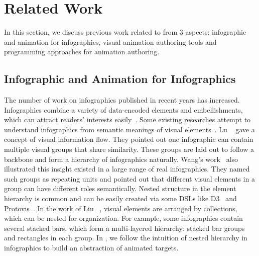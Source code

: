 \section{Related Work}

In this section, we discuss previous work related to \gaia{} from 3 aspects: infographic and animation for infographics, visual animation authoring tools and programming approaches for animation authoring.

\subsection{Infographic and Animation for Infographics}
The number of work on infographics published in recent years has increased.
Infographics combine a variety of data-encoded elements and embellishments, which can attract readers’ interests easily~\cite{bateman2010useful, haroz2015isotype, borkin2013makes, wang2019emotional}. %
Some existing researches attempt to understand infographics from semantic meanings of visual elements~\cite{lu2020exploring, wang2021animated}. 
Lu \etal~\cite{lu2020exploring} gave a concept of visual information flow. They pointed out one infographic can contain multiple visual groups that share similarity. 
These groups are laid out to follow a backbone and form a hierarchy of infographics naturally.
Wang's work~\cite{wang2021animated} also illustrated this insight existed in a large range of real infographics.
They named such groups as repeating units and pointed out that different visual elements in a group can have different roles semantically.
Nested structure in the element hierarchy is common and can be easily created via some DSLs like D3~\cite{bostock2011d3} and Protovis~\cite{heer2010declarative}.
In the work of Liu \etal~\cite{liu2018data}, visual elements are arranged by collections, which can be nested for organization.
For example, some infographics contain several stacked bars, which form a multi-layered hierarchy: stacked bar groups and rectangles in each group.
In \gaia{}, we follow the intuition of nested hierarchy in infographics to build an abstraction of animated targets. 

